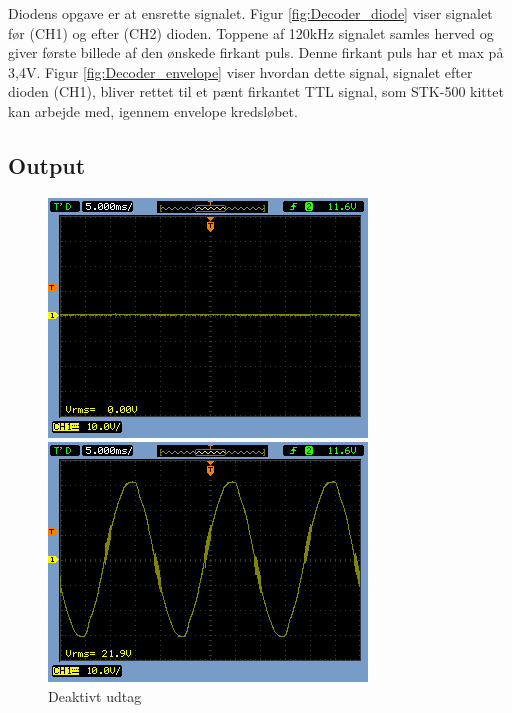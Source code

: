 Diodens opgave er at ensrette signalet. Figur \ref{fig:Decoder_diode} viser signalet før (CH1) og efter (CH2) dioden. Toppene af 120kHz signalet samles herved og giver første billede af den ønskede firkant puls. Denne firkant puls har et max på 3,4V. Figur \ref{fig:Decoder_envelope} viser hvordan dette signal, signalet efter dioden (CH1), bliver rettet til et pænt firkantet TTL signal, som STK-500 kittet kan arbejde med, igennem envelope kredsløbet. 
  

\subsection{Output}

\begin{figure}[htb]
  \begin{minipage}{0.45\textwidth}
    \centering
	\includegraphics[width=\textwidth]{billeder/HWTest/Decoder/Decoder_relay_open}
		\caption{Deaktivt udtag}
	\label{fig:relay_open}
  \end{minipage}
  \hspace{0.1\textwidth}
  \begin{minipage}{0.45\textwidth}
    \centering
	\includegraphics[width=\textwidth]{billeder/HWTest/Decoder/Decoder_relay_closed}

\end{minipage}
\end{figure}
